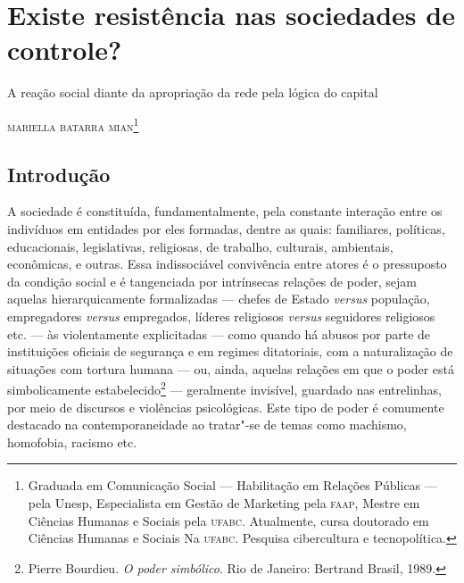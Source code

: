 \chapter{Existe resistência nas sociedades de controle?}{A reação social diante da apropriação da rede pela lógica do capital}{}


\begin{flushright}
\textsc{mariella batarra mian\footnote{Graduada em Comunicação Social --- Habilitação em Relações Públicas --- pela Unesp, Especialista em Gestão de Marketing pela \textsc{faap}, Mestre em Ciências Humanas e Sociais pela \textsc{ufabc}. Atualmente, cursa doutorado em Ciências Humanas e Sociais Na \textsc{ufabc}. Pesquisa cibercultura e tecnopolítica.}}
\end{flushright}


 \section{Introdução}

\noindent{}A sociedade é constituída, fundamentalmente, pela constante interação
entre os indivíduos em entidades por eles formadas, dentre as quais:
familiares, políticas, educacionais, legislativas, religiosas, de
trabalho, culturais, ambientais, econômicas, e outras. Essa
indissociável convivência entre atores é o pressuposto da condição
social e é tangenciada por intrínsecas relações de poder, sejam aquelas
hierarquicamente formalizadas --- chefes de Estado \emph{versus}
população, empregadores \emph{versus} empregados, líderes religiosos
\emph{versus} seguidores religiosos etc. --- às violentamente
explicitadas --- como quando há abusos por parte de instituições oficiais
de segurança e em regimes ditatoriais, com a naturalização de situações
com tortura humana --- ou, ainda, aquelas relações em que o poder está
simbolicamente estabelecido\footnote{Pierre Bourdieu. \emph{O poder simbólico}. Rio de Janeiro: Bertrand Brasil, 1989.} --- geralmente invisível,
guardado nas entrelinhas, por meio de discursos e violências
psicológicas. Este tipo de poder é comumente destacado na
contemporaneidade ao tratar"-se de temas como machismo, homofobia,
racismo etc.

